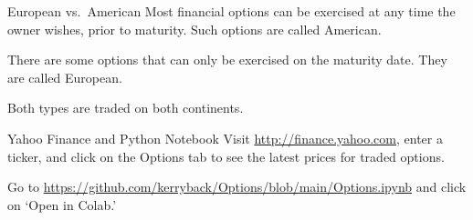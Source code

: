 \documentclass[10pt]{beamer}
\begin{document}
\begin{frame}{European vs.\ American}
    Most financial options can be exercised at any time the owner wishes, prior to maturity.  Such options are called American.
    
    There are some options that can only be exercised on the maturity date.  They are called European.
    
    Both types are traded on both continents.
\end{frame}

\begin{frame}{Yahoo Finance and Python Notebook}
  Visit \url{http://finance.yahoo.com}, enter a ticker, and click on the Options tab to see the latest prices for traded options.
  
  Go to \url{https://github.com/kerryback/Options/blob/main/Options.ipynb} and click on `Open in Colab.'
\end{frame}
\end{document}

